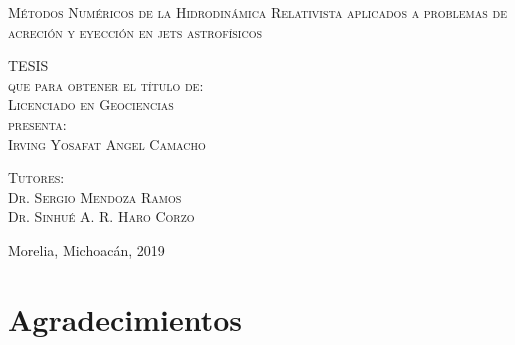 \documentclass[letterpaper,12pt,oneside]{book}
\begin{document}
\begin{titlepage}
\begin{minipage}[c][0.81\textheight][t]{0.75\textwidth}
\begin{center}
                {\large\scshape Métodos Numéricos de la Hidrodinámica Relativista aplicados a problemas de acreción y eyección en jets astrofísicos}\\[.2in]

                \vspace{2cm}            

                \textsc{\LARGE T\hspace{1.5cm}E\hspace{1.5cm}S\hspace{1.5cm}I\hspace{1.5cm}S}\\[0.5cm]
                \textsc{\large que para obtener el t\'itulo de:}\\[0.5cm]
                \textsc{\large Licenciado en Geociencias}\\[0.5cm]
                \textsc{\large presenta:}\\[0.5cm]
                \textsc{\large {Irving Yosafat Angel Camacho}}\\[2cm]          

                \vspace{0.5cm}

                {\large\scshape Tutores:\\[0.3cm] {Dr. Sergio Mendoza Ramos \\ 
Dr. Sinhué A. R. Haro Corzo}}\\[.2in]

                \vspace{0.5cm}

                \large{Morelia, Michoacán,}{ }{2019}
            \end{center}
        \end{minipage}
    \end{titlepage}



\frontmatter
\chapter*{}


\chapter{Agradecimientos}
\end{document}
